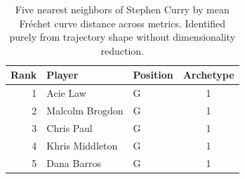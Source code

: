 \begin{table}[htbp]
  \centering\small
  \begin{tabular}{rllc}
    \toprule
    Rank & Player & Position & Archetype \\
    \midrule
    1 & Acie Law & G & 1 \\
    2 & Malcolm Brogdon & G & 1 \\
    3 & Chris Paul & G & 1 \\
    4 & Khris Middleton & G & 1 \\
    5 & Dana Barros & G & 1 \\
    \bottomrule
  \end{tabular}
  \caption{Five nearest neighbors of Stephen Curry by mean Fr\'{e}chet curve distance across metrics. Identified purely from trajectory shape without dimensionality reduction.}
  \label{tab:Stephen_Curry_frechet_curve_neighbors}
\end{table}

